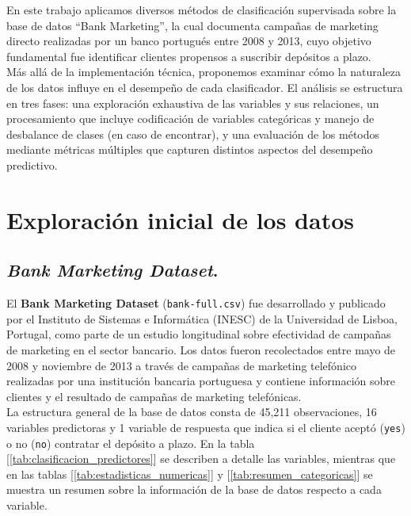 \documentclass[10pt]{article}
\begin{document}
En este trabajo aplicamos diversos métodos de clasificación supervisada sobre la base de datos ``Bank Marketing'', la cual documenta campañas de marketing directo realizadas por un banco portugués entre 2008 y 2013, cuyo objetivo fundamental fue identificar clientes propensos a suscribir depósitos a plazo.\\

Más allá de la implementación técnica, proponemos examinar cómo la naturaleza de los datos influye en el desempeño de cada clasificador. El análisis se estructura en tres fases: una exploración exhaustiva de las variables y sus relaciones, un procesamiento que incluye codificación de variables categóricas y manejo de desbalance de clases (en caso de encontrar), y una evaluación de los métodos mediante métricas múltiples que capturen distintos aspectos del desempeño predictivo.


\section{Exploración inicial de los datos}\label{sec:dataset}

\subsection{\textit{Bank Marketing Dataset}.}

El \textbf{Bank Marketing Dataset} (\texttt{bank-full.csv}) fue desarrollado y publicado por el Instituto de Sistemas e Informática (INESC) de la Universidad de Lisboa, Portugal, como parte de un estudio longitudinal sobre efectividad de campañas de marketing en el sector bancario. Los datos fueron recolectados entre mayo de 2008 y noviembre de 2013 a través de campañas de marketing telefónico realizadas por una institución bancaria portuguesa y contiene información sobre clientes y el resultado de campañas de marketing telefónicas.\\

La estructura general de la base de datos consta de 45,211 observaciones, 16 variables predictoras y 1 variable de respuesta que indica si el cliente aceptó (\texttt{yes}) o no (\texttt{no}) contratar el depósito a plazo. En la tabla [\ref{tab:clasificacion_predictores}] se describen a detalle las variables, mientras que en las tablas [\ref{tab:estadisticas_numericas}] y [\ref{tab:resumen_categoricas}] se muestra un resumen sobre la información de la base de datos respecto a cada variable.\\
\end{document}
